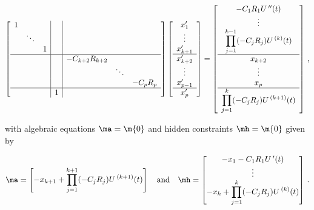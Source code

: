 \begin{small}
  \begin{equation*}
    \left[\begin{array}{ccc|c|ccc}
      1 &        &   & \\
        & \ddots &   & \\
        &        & 1 & \\ \hline
        &        &   & & -C_{k+2} R_{k+2} \\
        &        &   & & & \ddots \\
        &        &   & & & & -C_{p} R_{p} \\ \hline
        &        &   & 1 \\
    \end{array}\right]
    \left[\begin{array}{c}
      x_1^{\prime} \\ \vdots \\ x_{k+1}^{\prime} \\ \hline
      x_{k+2}^{\prime} \\ \vdots \\ x_{p-1}^{\prime} \\ \hline
      x_p^{\prime}
    \end{array}\right] = \left[\begin{array}{c}
      -C_1 R_1 U{\,}^{\prime\prime}(t) \\
      \vdots \\
      \displaystyle\prod_{j=1}^{k-1} (-C_j R_j) U{\,}^{(k)}(t) \\ \hline
      x_{k+2} \\ \vdots \\ x_p \\ \hline
      \displaystyle\prod_{j=1}^{k} (-C_j R_j) U{\,}^{(k+1)}(t)
    \end{array}\right] \, \text{,}
  \end{equation*}
\end{small}
%
with algebraic equations $\ma = \m{0}$ and hidden constraints $\mh = \m{0}$ given by
%
\begin{small}
  \begin{equation*}
    \ma = \begin{bmatrix}
      -x_{k+1} + \displaystyle\prod_{j=1}^{k+1} (-C_j R_j) U{\,}^{(k+1)}(t)
    \end{bmatrix}
    \quad \text{and} \quad
    \mh = \begin{bmatrix}
      -x_{1} - C_1 R_1 U{\,}^{\prime}(t) \\
      \vdots \\
      -x_k + \displaystyle\prod_{j=1}^{k} (-C_j R_j) U{\,}^{(k)}(t)
    \end{bmatrix} \, \text{.}
  \end{equation*}
\end{small}
